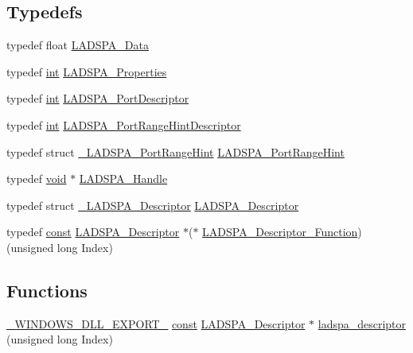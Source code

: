 \subsection*{Typedefs}
\begin{DoxyCompactItemize}
\item 
typedef float \hyperlink{win_2_l_a_d_s_p_a__plugins-win_2ladspa_8h_aad99c00d8bf98c0c147f2b38fad9e3ff}{L\+A\+D\+S\+P\+A\+\_\+\+Data}
\item 
typedef \hyperlink{xmltok_8h_a5a0d4a5641ce434f1d23533f2b2e6653}{int} \hyperlink{win_2_l_a_d_s_p_a__plugins-win_2ladspa_8h_a05dff5c988598101d21699d13e7ed87e}{L\+A\+D\+S\+P\+A\+\_\+\+Properties}
\item 
typedef \hyperlink{xmltok_8h_a5a0d4a5641ce434f1d23533f2b2e6653}{int} \hyperlink{win_2_l_a_d_s_p_a__plugins-win_2ladspa_8h_a90f9a17bef9e9a9c5e34f2a1973379e2}{L\+A\+D\+S\+P\+A\+\_\+\+Port\+Descriptor}
\item 
typedef \hyperlink{xmltok_8h_a5a0d4a5641ce434f1d23533f2b2e6653}{int} \hyperlink{win_2_l_a_d_s_p_a__plugins-win_2ladspa_8h_a713a427aa2ce55d37b4d00b81d04fbe4}{L\+A\+D\+S\+P\+A\+\_\+\+Port\+Range\+Hint\+Descriptor}
\item 
typedef struct \hyperlink{struct___l_a_d_s_p_a___port_range_hint}{\+\_\+\+L\+A\+D\+S\+P\+A\+\_\+\+Port\+Range\+Hint} \hyperlink{win_2_l_a_d_s_p_a__plugins-win_2ladspa_8h_a7e37004ec91d14bac773882b9d7c5593}{L\+A\+D\+S\+P\+A\+\_\+\+Port\+Range\+Hint}
\item 
typedef \hyperlink{sound_8c_ae35f5844602719cf66324f4de2a658b3}{void} $\ast$ \hyperlink{win_2_l_a_d_s_p_a__plugins-win_2ladspa_8h_add2c8d62e2cb03e4fd16ab3f997d4195}{L\+A\+D\+S\+P\+A\+\_\+\+Handle}
\item 
typedef struct \hyperlink{struct___l_a_d_s_p_a___descriptor}{\+\_\+\+L\+A\+D\+S\+P\+A\+\_\+\+Descriptor} \hyperlink{win_2_l_a_d_s_p_a__plugins-win_2ladspa_8h_a70af0eb5721240f2a0b2f1dfb8f74637}{L\+A\+D\+S\+P\+A\+\_\+\+Descriptor}
\item 
typedef \hyperlink{getopt1_8c_a2c212835823e3c54a8ab6d95c652660e}{const} \hyperlink{src_2effects_2ladspa_2ladspa_8h_a70af0eb5721240f2a0b2f1dfb8f74637}{L\+A\+D\+S\+P\+A\+\_\+\+Descriptor} $\ast$($\ast$ \hyperlink{win_2_l_a_d_s_p_a__plugins-win_2ladspa_8h_a88530a3e12094d9d38c7422299f9d136}{L\+A\+D\+S\+P\+A\+\_\+\+Descriptor\+\_\+\+Function}) (unsigned long Index)
\end{DoxyCompactItemize}
\subsection*{Functions}
\begin{DoxyCompactItemize}
\item 
\hyperlink{win_2_l_a_d_s_p_a__plugins-win_2ladspa_8h_aa2a8bb4f4c66533d57d205f4d3583f4f}{\+\_\+\+W\+I\+N\+D\+O\+W\+S\+\_\+\+D\+L\+L\+\_\+\+E\+X\+P\+O\+R\+T\+\_\+} \hyperlink{getopt1_8c_a2c212835823e3c54a8ab6d95c652660e}{const} \hyperlink{src_2effects_2ladspa_2ladspa_8h_a70af0eb5721240f2a0b2f1dfb8f74637}{L\+A\+D\+S\+P\+A\+\_\+\+Descriptor} $\ast$ \hyperlink{win_2_l_a_d_s_p_a__plugins-win_2ladspa_8h_a8b20a849ab66e5f28babbb8a3543e60f}{ladspa\+\_\+descriptor} (unsigned long Index)
\end{DoxyCompactItemize}


